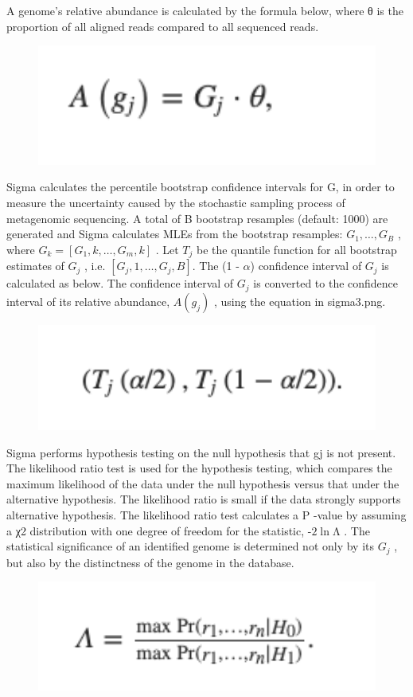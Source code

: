 A genome's relative abundance is calculated by the formula below, where θ is the proportion of all aligned reads compared to all sequenced reads.
\begin{figure}
    \centering
    \includegraphics[width=12cm]{Images/sigma3.png}
    \label{fig:sigma3.png}
\end{figure}
Sigma calculates the percentile bootstrap confidence intervals for G, in order to measure the uncertainty caused by the stochastic sampling process of metagenomic sequencing.   A total of B bootstrap resamples (default: 1000) are generated and Sigma calculates MLEs from the bootstrap resamples: $G_1,…,G_B$ , where $G_k=[G_1,k,…,G_m,k]$ . Let $T_j$ be the quantile function for all bootstrap estimates of $G_j$ , i.e. $[G_j,1,…,G_j,B]$. The (1 - $\alpha$) confidence interval of $G_j$ is calculated as below.  The confidence interval of $G_j$ is converted to the confidence interval of its relative abundance, $A(g_j)$ , using the equation in sigma3.png.
\begin{figure}
    \centering
    \includegraphics[width=12cm]{Images/sigma4.png}
    \label{fig:Images/sigma4.png}
\end{figure}
Sigma performs hypothesis testing on the null hypothesis that gj is not present. The likelihood ratio test is used for the hypothesis testing, which compares the maximum likelihood of the data under the null hypothesis versus that under the alternative hypothesis. The likelihood ratio is small if the data strongly supports alternative hypothesis. The likelihood ratio test calculates a P -value by assuming a χ2 distribution with one degree of freedom for the statistic, -$2\ln$Λ . The statistical significance of an identified genome is determined not only by its $G_j$ , but also by the distinctness of the genome in the database.
\begin{figure}
    \centering
    \includegraphics[width=12cm]{Images/sigma5.png}
    \label{fig:Images/sigma5.png}
\end{figure}
